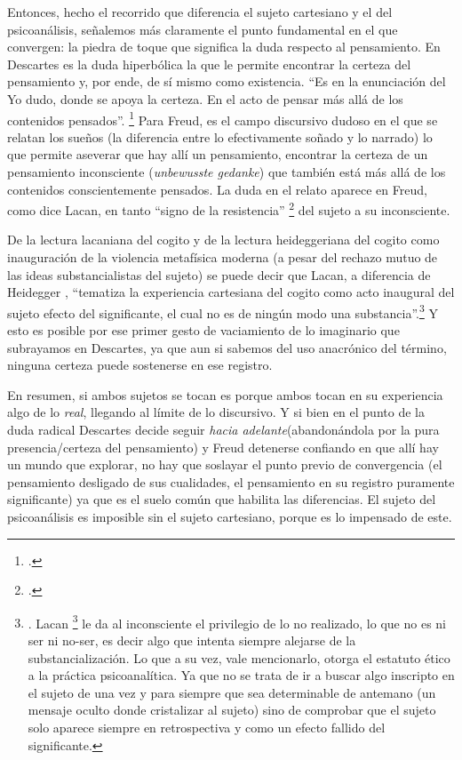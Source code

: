 Entonces, hecho el recorrido que diferencia el sujeto cartesiano y el del psicoanálisis, señalemos más claramente el punto fundamental en el que convergen: la piedra de toque que significa la duda respecto al pensamiento. En Descartes es la duda hiperbólica la que le permite encontrar la certeza del pensamiento y, por ende, de sí mismo como existencia. \enquote{Es en la enunciación del Yo dudo, donde se apoya la certeza. En el acto de pensar más allá de los contenidos pensados}. \footcite[][101]{@7122-GIUSSANI1991} Para Freud, es el campo discursivo dudoso en el que se relatan los sueños (la diferencia entre lo efectivamente soñado y lo narrado) lo que permite aseverar que hay allí un pensamiento, encontrar la certeza de un pensamiento inconsciente (\emph{unbewusste gedanke}) que también está más allá de los contenidos conscientemente pensados. La duda en el relato aparece en Freud, como dice Lacan, en tanto \enquote{signo de la resistencia} \footcite[][43]{@7106-LACAN2006} del sujeto a su inconsciente.

De la lectura lacaniana del cogito y de la lectura heideggeriana del cogito como inauguración de la violencia metafísica moderna (a pesar del rechazo mutuo de las ideas substancialistas del sujeto) se puede decir que Lacan, a diferencia de Heidegger , \enquote{tematiza la experiencia cartesiana del cogito como acto inaugural del sujeto efecto del significante, el cual no es de ningún modo una substancia}.\footnote{ \cite[][86-87]{@7122-GIUSSANI1991}. Lacan \footcite[][30]{@7106-LACAN2006} le da al inconsciente el privilegio de lo no realizado, lo que no es ni ser ni no-ser, es decir algo que intenta siempre alejarse de la substancialización. Lo que a su vez, vale mencionarlo, otorga el estatuto ético a la práctica psicoanalítica. Ya que no se trata de ir a buscar algo inscripto en el sujeto de una vez y para siempre que sea determinable de antemano (un mensaje oculto donde cristalizar al sujeto) sino de comprobar que el sujeto solo aparece siempre en retrospectiva y como un efecto fallido del significante.} Y esto es posible por ese primer gesto de vaciamiento de lo imaginario que subrayamos en Descartes, ya que aun si sabemos del uso anacrónico del término, ninguna certeza puede sostenerse en ese registro.

En resumen, si ambos sujetos se tocan es porque ambos tocan en su experiencia algo de lo \emph{real}, llegando al límite de lo discursivo. Y si bien en el punto de la duda radical Descartes decide seguir \emph{hacia adelante}(abandonándola por la pura presencia/certeza del pensamiento) y Freud detenerse confiando en que allí hay un mundo que explorar, no hay que soslayar el punto previo de convergencia (el pensamiento desligado de sus cualidades, el pensamiento en su registro puramente significante) ya que es el suelo común que habilita las diferencias. El sujeto del psicoanálisis es imposible sin el sujeto cartesiano, porque es lo impensado de este.

